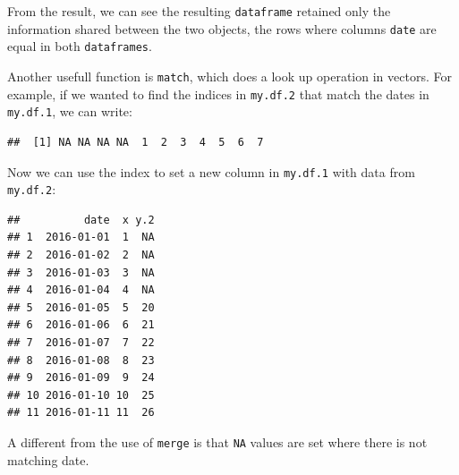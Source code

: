 \documentclass[11pt,]{book}
\newenvironment{Shaded}{\begin{snugshade}}{\end{snugshade}}
\newcommand{\KeywordTok}[1]{\textcolor[rgb]{0.27,0.27,0.27}{\textbf{#1}}}
\newcommand{\DecValTok}[1]{\textcolor[rgb]{0.06,0.06,0.06}{#1}}
\newcommand{\StringTok}[1]{\textcolor[rgb]{0.5,0.5,0.5}{#1}}
\newcommand{\CommentTok}[1]{\textcolor[rgb]{0.56,0.35,0.01}{\textit{#1}}}
\newcommand{\OperatorTok}[1]{\textcolor[rgb]{0.81,0.36,0.00}{\textbf{#1}}}
\newcommand{\NormalTok}[1]{#1}
\begin{document}
From the result, we can see the resulting \texttt{dataframe} retained
only the information shared between the two objects, the rows where
columns \texttt{date} are equal in both \texttt{dataframes}.

Another usefull function is \texttt{match}, which does a look up
operation in vectors. For example, if we wanted to find the indices in
\texttt{my.df.2} that match the dates in \texttt{my.df.1}, we can write:

\begin{Shaded}
\end{Shaded}

\begin{verbatim}
##  [1] NA NA NA NA  1  2  3  4  5  6  7
\end{verbatim}

Now we can use the index to set a new column in \texttt{my.df.1} with
data from \texttt{my.df.2}:

\begin{Shaded}
\end{Shaded}

\begin{verbatim}
##          date  x y.2
## 1  2016-01-01  1  NA
## 2  2016-01-02  2  NA
## 3  2016-01-03  3  NA
## 4  2016-01-04  4  NA
## 5  2016-01-05  5  20
## 6  2016-01-06  6  21
## 7  2016-01-07  7  22
## 8  2016-01-08  8  23
## 9  2016-01-09  9  24
## 10 2016-01-10 10  25
## 11 2016-01-11 11  26
\end{verbatim}

A different from the use of \texttt{merge} is that \texttt{NA} values
are set where there is not matching date.
\end{document}
